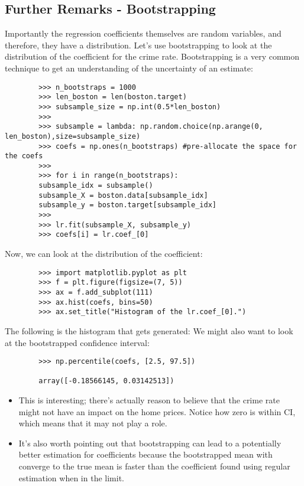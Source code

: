 \documentclass[SKL-MASTER.tex]{subfiles}
\begin{document}
	\subsection*{Further Remarks - Bootstrapping} %
	Importantly the regression coefficients themselves are
	random variables, and therefore, they have a distribution. Let's use bootstrapping to look
	at the distribution of the coefficient for the crime rate. Bootstrapping is a very common
	technique to get an understanding of the uncertainty of an estimate:
	\begin{framed}
		\begin{verbatim}
		>>> n_bootstraps = 1000
		>>> len_boston = len(boston.target)
		>>> subsample_size = np.int(0.5*len_boston)
		>>>
		>>> subsample = lambda: np.random.choice(np.arange(0, len_boston),size=subsample_size)
		>>> coefs = np.ones(n_bootstraps) #pre-allocate the space for the coefs
		>>>
		>>> for i in range(n_bootstraps):
		subsample_idx = subsample()
		subsample_X = boston.data[subsample_idx]
		subsample_y = boston.target[subsample_idx]
		>>>
		>>> lr.fit(subsample_X, subsample_y)
		>>> coefs[i] = lr.coef_[0]
		\end{verbatim}
	\end{framed}
	Now, we can look at the distribution of the coefficient:
	\begin{framed}
		\begin{verbatim}
		>>> import matplotlib.pyplot as plt
		>>> f = plt.figure(figsize=(7, 5))
		>>> ax = f.add_subplot(111)
		>>> ax.hist(coefs, bins=50)
		>>> ax.set_title("Histogram of the lr.coef_[0].")
		\end{verbatim}
	\end{framed}
	The following is the histogram that gets generated:
	We might also want to look at the bootstrapped confidence interval:
	\begin{framed}
		\begin{verbatim}
		>>> np.percentile(coefs, [2.5, 97.5])
		
		array([-0.18566145, 0.03142513])
		\end{verbatim}
	\end{framed}
	\begin{itemize}
		\item 
		This is interesting; there's actually reason to believe that the crime rate might not have an
		impact on the home prices. Notice how zero is within CI, which means that it may not play
		a role.
		\item It's also worth pointing out that bootstrapping can lead to a potentially better estimation for
		coefficients because the bootstrapped mean with converge to the true mean is faster than
		the coefficient found using regular estimation when in the limit.
	\end{itemize}
	
	
\end{document}
